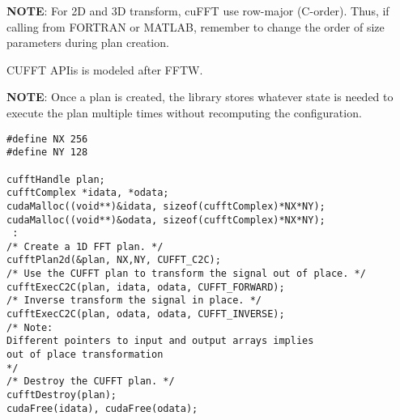 {\bf NOTE}: For 2D and 3D transform, cuFFT use row-major (C-order).
Thus, if calling from FORTRAN or MATLAB, remember to change the order
of size parameters during plan creation.

CUFFT APIis is modeled after FFTW.

{\bf NOTE}: Once a plan is created, the library stores whatever state
is needed to execute the plan multiple times without recomputing the
configuration.


\begin{lstlisting}
#define NX 256
#define NY 128

cufftHandle plan;
cufftComplex *idata, *odata;
cudaMalloc((void**)&idata, sizeof(cufftComplex)*NX*NY);
cudaMalloc((void**)&odata, sizeof(cufftComplex)*NX*NY);
 :
/* Create a 1D FFT plan. */
cufftPlan2d(&plan, NX,NY, CUFFT_C2C);
/* Use the CUFFT plan to transform the signal out of place. */
cufftExecC2C(plan, idata, odata, CUFFT_FORWARD);
/* Inverse transform the signal in place. */
cufftExecC2C(plan, odata, odata, CUFFT_INVERSE);
/* Note:
Different pointers to input and output arrays implies 
out of place transformation
*/
/* Destroy the CUFFT plan. */
cufftDestroy(plan);
cudaFree(idata), cudaFree(odata);
\end{lstlisting}


